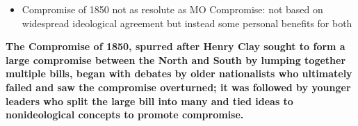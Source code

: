 \documentclass[a4paper]{article}
\begin{document}
{\begin{itemize}
\begin{itemize}
\begin{itemize}
                \end{itemize}
            \end{itemize}
            \item Compromise of 1850 not as resolute as MO Compromise: not based on widespread ideological agreement but instead some personal benefits for both
        \end{itemize}
        \textbf{The Compromise of 1850, spurred after Henry Clay sought to form a large compromise between the North and South by lumping together multiple bills, began with debates by older nationalists who ultimately failed and saw the compromise overturned; it was followed by younger leaders who split the large bill into many and tied ideas to nonideological concepts to promote compromise.}}
    
\end{document}
